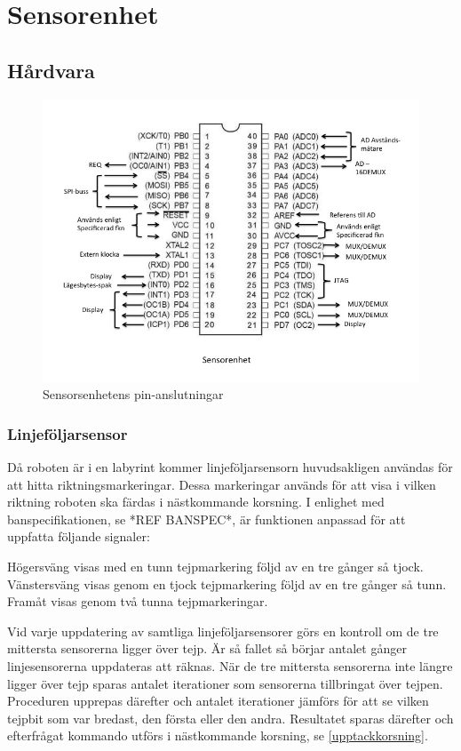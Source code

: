 \section{Sensorenhet}

\subsection{Hårdvara}

\begin{figure}[H]
  \centering
 \includegraphics[angle=0,scale=0.5]{bilder/PIN_sensor.jpg}
  \caption{Sensorsenhetens pin-anslutningar}
  \label{fig:PINsensor}
\end{figure}


\subsubsection{Linjeföljarsensor}

\label{riktmark}
Då roboten är i en labyrint kommer linjeföljarsensorn huvudsakligen användas för att hitta riktningsmarkeringar. Dessa markeringar används för att visa i vilken riktning roboten ska färdas i nästkommande korsning.  I enlighet med banspecifikationen, se *REF BANSPEC*, är funktionen anpassad för att uppfatta följande signaler:

Högersväng visas med en tunn tejpmarkering följd av en tre gånger så tjock.
Vänstersväng visas genom en tjock tejpmarkering följd av en tre gånger så tunn.
Framåt visas genom två tunna tejpmarkeringar.

Vid varje uppdatering av samtliga linjeföljarsensorer görs en kontroll om de tre mittersta sensorerna ligger över tejp. Är så fallet så börjar antalet gånger linjesensorerna uppdateras att räknas. När de tre mittersta sensorerna inte längre ligger över tejp sparas antalet iterationer som sensorerna tillbringat över tejpen. Proceduren upprepas därefter och antalet iterationer jämförs för att se vilken tejpbit som var bredast, den första eller den andra. Resultatet sparas därefter och efterfrågat kommando utförs i nästkommande korsning, se \ref{upptackkorsning}.


